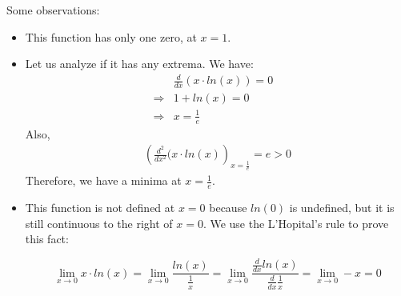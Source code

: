 \documentclass[12]{article}
\begin{document}
    Some observations:
    
    \begin{itemize}
        \item This function has only one zero, at $x = 1$.
        \item Let us analyze if it has any extrema. We have:
        \begin{eqnarray}
         &\frac{d}{dx}(x\cdot ln(x)) = 0& \nonumber \\
         \Longrightarrow &1 + ln(x) = 0& \nonumber \\
         \Longrightarrow &x = \frac{1}{e}& \nonumber
        \end{eqnarray}
        Also,
        \begin{eqnarray}
         \left(\frac{d^2}{dx^2}(x\cdot ln(x)\right)_{x=\frac{1}{e}} = e > 0 \nonumber
        \end{eqnarray}
        Therefore, we have a minima at $x = \frac{1}{e}.$
        \item This function is not defined at $x = 0$ because $ln(0)$ is undefined, but it is still continuous to the right of $x = 0$. We use the L'Hopital's rule to prove this fact:
        
        \begin{equation}
            \lim_{x\to0} x\cdot ln(x) = \lim_{x\to0} \frac{ln(x)}{\frac{1}{x}} = \lim_{x\to0} \frac{\frac{d}{dx}ln(x)}{\frac{d}{dx}\frac{1}{x}} = \lim_{x\to0}-x = 0 \nonumber
        \end{equation}
    \end{itemize}
    
\end{document}
